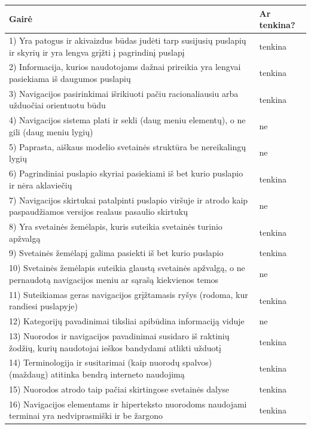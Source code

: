 \documentclass{VUMIFPSkursinis}
\begin{document}
\begin{longtable}{ |p{}|p{2cm}| } 
 \hline
	Gairė & Ar tenkina? \\ \hline
	1) Yra patogus ir akivaizdus būdas judėti tarp susijusių puslapių ir skyrių ir yra lengva grįžti į pagrindinį puslapį & tenkina \\ \hline
	2) Informacija, kurios naudotojams dažnai prireikia yra lengvai pasiekiama iš daugumos puslapių & tenkina \\ \hline
	3) Navigacijos pasirinkimai išrikiuoti pačiu racionaliausiu arba užduočiai orientuotu būdu & tenkina \\ \hline
	4) Navigacijos sistema plati ir sekli (daug meniu elementų), o ne gili (daug meniu lygių)  & ne \\ \hline
	5) Paprasta, aiškaus modelio svetainės struktūra be nereikalingų lygių & ne \\ \hline
	6) Pagrindiniai puslapio skyriai pasiekiami iš bet kurio puslapio ir nėra aklaviečių & tenkina \\ \hline
	7) Navigacijos skirtukai patalpinti puslapio viršuje ir atrodo kaip paspaudžiamos versijos realaus pasaulio skirtukų & ne \\ \hline
	8) Yra svetainės žemėlapis, kuris suteikia svetainės turinio apžvalgą & tenkina \\ \hline
	9) Svetainės žemėlapį galima pasiekti iš bet kurio puslapio & tenkina \\ \hline
	10) Svetainės žemėlapis suteikia glaustą svetainės apžvalgą, o ne pernaudotą navigacijos meniu ar sąrašą kiekvienos temos & ne \\ \hline
	11) Suteikiamas geras navigacijos grįžtamasis ryšys (rodoma, kur randiesi puslapyje) & tenkina \\ \hline
	12) Kategorijų pavadinimai tiksliai apibūdina informaciją viduje & ne \\ \hline
	13) Nuorodos ir navigacijos pavadinimai susidaro iš raktinių žodžių, kurių naudotojai ieškos bandydami atlikti užduotį & tenkina \\ \hline
	14) Terminologija ir susitarimai (kaip nuorodų spalvos) (maždaug) atitinka bendrą interneto naudojimą & tenkina \\ \hline
	15) Nuorodos atrodo taip pačiai skirtingose svetainės dalyse & tenkina \\ \hline
	16) Navigacijos elementams ir hiperteksto nuorodoms naudojami terminai yra nedviprasmiški ir be žargono & tenkina \\ \hline

\end{longtable}
\end{document}
